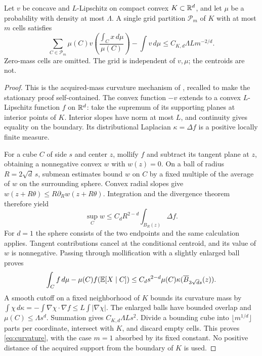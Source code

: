 \begin{lemma}\label{lem:curvature}
Let $v$ be concave and $L$-Lipschitz on compact convex $K\subset\mathbb R^d$, and let $\mu$ be a probability with density at most $\Lambda$. A single grid partition $\mathcal P_m$ of $K$ with at most $m$ cells satisfies
\begin{equation}\label{eq:curvature}
 \sum_{C\in\mathcal P_m}\mu(C)v\left(\frac{\int_Cx\,d\mu}{\mu(C)}\right)
       -\int v\,d\mu\le C_{K,d}\Lambda Lm^{-2/d}.
\end{equation}
Zero-mass cells are omitted. The grid is independent of $v,\mu$; the centroids are not.
\end{lemma}
\begin{proof}
This is the acquired-mass curvature mechanism of \cite{GTFControlled}, recalled to make the stationary proof self-contained. The convex function $-v$ extends to a convex $L$-Lipschitz function $f$ on $\mathbb R^d$: take the supremum of its supporting planes at interior points of $K$. Interior slopes have norm at most $L$, and continuity gives equality on the boundary. Its distributional Laplacian $\kappa=\Delta f$ is a positive locally finite measure.

For a cube $C$ of side $s$ and center $z$, mollify $f$ and subtract its tangent plane at $z$, obtaining a nonnegative convex $w$ with $w(z)=0$. On a ball of radius $R=2\sqrt d\,s$, submean estimates bound $w$ on $C$ by a fixed multiple of the average of $w$ on the surrounding sphere. Convex radial slopes give $w(z+R\theta)\le R\partial_Rw(z+R\theta)$. Integration and the divergence theorem therefore yield
\[
 \sup_Cw\le C_dR^{2-d}\int_{B_R(z)}\Delta f.
\]
For $d=1$ the sphere consists of the two endpoints and the same calculation applies. Tangent contributions cancel at the conditional centroid, and its value of $w$ is nonnegative. Passing through mollification with a slightly enlarged ball proves
\[
 \int_C f\,d\mu-\mu(C)f(\mathbb E[X\mid C])
 \le C_ds^{2-d}\mu(C)\kappa(\overline B_{3\sqrt d s}(z)).
\]
A smooth cutoff on a fixed neighborhood of $K$ bounds its curvature mass by
$\int\chi\,d\kappa=-\int\nabla\chi\cdot\nabla f\le L\int|\nabla\chi|$.
The enlarged balls have bounded overlap and $\mu(C)\le\Lambda s^d$. Summation gives $C_{K,d}\Lambda Ls^2$. Divide a bounding cube into $\lfloor m^{1/d}\rfloor$ parts per coordinate, intersect with $K$, and discard empty cells. This proves \eqref{eq:curvature}, with the case $m=1$ absorbed by its fixed constant. No positive distance of the acquired support from the boundary of $K$ is used.
\end{proof}

